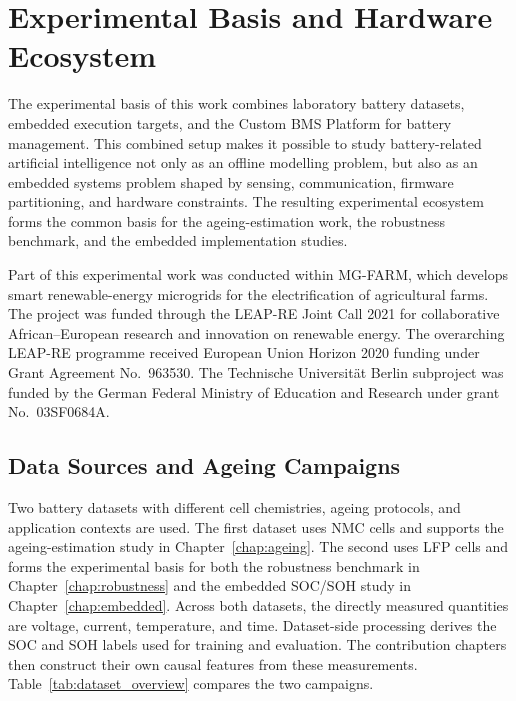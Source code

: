 \documentclass[
    a4paper,
    12pt,
    titlepage,
    bibliography=totoc,
    twoside=on,
    parskip=false,
    numbers=noenddot,
    cleardoublepage=empty,
    DIV=12,
    BCOR=12.0mm,
    headheight=36pt,
    headings=openright
]{scrreprt}
\begin{document}
\chapter{Experimental Basis and Hardware Ecosystem}
\label{chap:experimental}
The experimental basis of this work combines laboratory battery datasets, embedded execution targets, and the Custom BMS Platform for battery management. This combined setup makes it possible to study battery-related artificial intelligence not only as an offline modelling problem, but also as an embedded systems problem shaped by sensing, communication, firmware partitioning, and hardware constraints. The resulting experimental ecosystem forms the common basis for the ageing-estimation work, the robustness benchmark, and the embedded implementation studies.

Part of this experimental work was conducted within MG-FARM, which develops smart renewable-energy microgrids for the electrification of agricultural farms.\autocite{leap-reMGFARMSmart,microenergyMGFARMPoweringSustainable,technischeuniversitatberlinMGFarmSmart} The project was funded through the LEAP-RE Joint Call 2021 for collaborative African--European research and innovation on renewable energy.\autocite{leapreJointCall2021} The overarching LEAP-RE programme received European Union Horizon 2020 funding under Grant Agreement No.~963530.\autocite{europeancommissionLEAPRE2026} The Technische Universit\"at Berlin subproject was funded by the German Federal Ministry of Education and Research under grant No.~03SF0684A.\autocite{enargusMGFarm2026,rzepkaNeuralNetworkArchitecture2023a}

\section{Data Sources and Ageing Campaigns}
\label{sec:datasets}

Two battery datasets with different cell chemistries, ageing protocols, and application contexts are used. The first dataset uses NMC cells and supports the ageing-estimation study in Chapter~\ref{chap:ageing}. The second uses LFP cells and forms the experimental basis for both the robustness benchmark in Chapter~\ref{chap:robustness} and the embedded SOC/SOH study in Chapter~\ref{chap:embedded}. Across both datasets, the directly measured quantities are voltage, current, temperature, and time. Dataset-side processing derives the SOC and SOH labels used for training and evaluation. The contribution chapters then construct their own causal features from these measurements. Table~\ref{tab:dataset_overview} compares the two campaigns.
\end{document}
